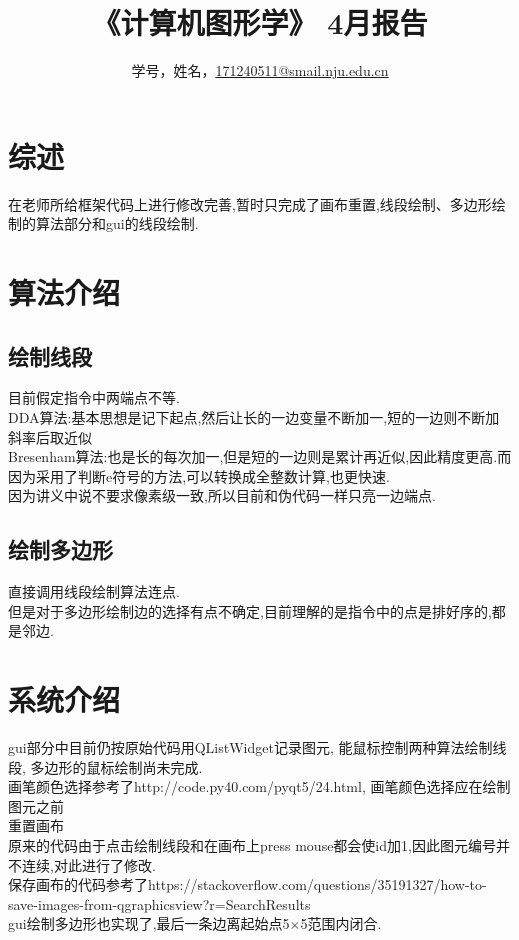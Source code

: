 \documentclass[a4paper,UTF8]{article}
\theoremstyle{definition}
\begin{document}
\title{\textbf{《计算机图形学》 4月报告 }}
\author{学号，姓名，\href{mailto:xxx@xxx.com}{171240511@smail.nju.edu.cn}}
\maketitle

\section{综述}
在老师所给框架代码上进行修改完善,暂时只完成了画布重置,线段绘制、多边形绘制的算法部分和gui的线段绘制.

\section{算法介绍}
\subsection{绘制线段}
目前假定指令中两端点不等.\\
\indent DDA算法:基本思想是记下起点,然后让长的一边变量不断加一,短的一边则不断加斜率后取近似\cite{rog_2002}\\
\indent Bresenham算法:也是长的每次加一,但是短的一边则是累计再近似,因此精度更高.而因为采用了判断e符号的方法,可以转换成全整数计算,也更快速.\cite{rog_2002}\\
\indent 因为讲义中说不要求像素级一致,所以目前和伪代码一样只亮一边端点.
\subsection{绘制多边形}
直接调用线段绘制算法连点.\\
\indent 但是对于多边形绘制边的选择有点不确定,目前理解的是指令中的点是排好序的,都是邻边.
		
\section{系统介绍}
gui部分中目前仍按原始代码用QListWidget记录图元, 能鼠标控制两种算法绘制线段,
多边形的鼠标绘制尚未完成.\\
画笔颜色选择参考了http://code.py40.com/pyqt5/24.html, 画笔颜色选择应在绘制图元之前\\
重置画布\\
原来的代码由于点击绘制线段和在画布上press mouse都会使id加1,因此图元编号并不连续,对此进行了修改.\\
保存画布的代码参考了https://stackoverflow.com/questions/35191327/how-to-save-images-from-qgraphicsview?r=SearchResults\\
gui绘制多边形也实现了,最后一条边离起始点5$\times$5范围内闭合.\\
\end{document}
